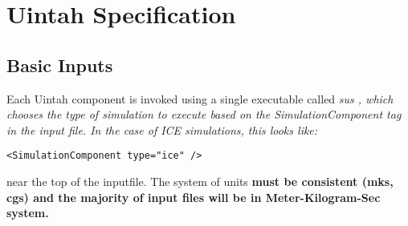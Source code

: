 
\section{Uintah Specification}
\subsection{Basic Inputs}
Each Uintah component is invoked using a single executable called
\it sus \normalfont, which chooses the type of simulation
to execute based on the \it SimulationComponent \normalfont tag in the
input file.  In the case of ICE simulations, this looks like:
%
\begin{Verbatim}[fontsize=\footnotesize]
 <SimulationComponent type="ice" />
\end{Verbatim}
%
near the top of the inputfile.  The system of units \bf{must }\normalfont be
consistent (mks, cgs) and the majority of input files will be in Meter-Kilogram-Sec
system.


%
